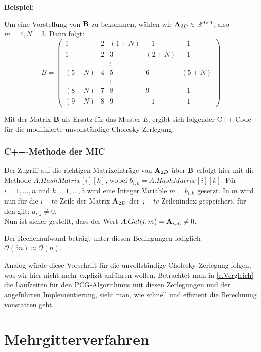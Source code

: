 \textbf{Beispiel:}

Um eine Vorstellung von ${\textbf{B}}$ zu bekommen, wählen wir ${\textbf{A}}_{2D} \in \mathbb{R}^{9 \times 9}$, also $m = 4, N = 3$. Dann folgt:
\begin{equation}
B = 
\begin{pmatrix}
1 & 2 & (1+N) & -1 & -1\\
1 & 2 & 3 & (2+N) & -1\\
  &   & \vdots & &\\
(5-N) & 4 & 5 & 6 & (5+N)\\
  &   & \vdots & &\\
(8-N) & 7 & 8 & 9 & -1\\
(9-N) & 8 & 9 & -1 & -1
\end{pmatrix}
\end{equation}

Mit der Matrix ${\textbf{B}}$ als Ersatz für das Muster $E$, ergibt sich folgender C++-Code für die modifizierte unvollständige Cholesky-Zerlegung:

\subsection{C++-Methode der MIC}\label{s.MIC}

Der Zugriff auf die richtigen Matrixeinträge von ${\textbf{A}}_{2D}$ über ${\textbf{B}}$ erfolgt hier mit die Methode $A.HashMatrix[i][k]$, wobei $b_{i,k} = A.HashMatrix[i][k]$. Für $i = 1,...,n$ und $k = 1,...,5$ wird eine Integer Variable $m = b_{i,k}$ gesetzt. In $m$ wird nun für die $i - te$ Zeile der Matrix ${\textbf{A}}_{2D}$ der $j - te$ Zeilenindex gespeichert, für den gilt: $a_{i,j} \ne 0$.\\
Nun ist sicher gestellt, dass der Wert $A.Get(i,m) = {\textbf{A}}_{i,m} \ne 0$.

Der Rechenaufwand beträgt unter diesen Bedingungen lediglich $\mathcal{O}(5n) \approx \mathcal{O}(n)$.

Analog würde diese Vorschrift für die unvollständige Cholesky-Zerlegung folgen, was wir hier nicht mehr explizit anführen wollen. Betrachtet man in \autoref{c.Vergleich} die Laufzeiten für den PCG-Algorithmus mit diesen Zerlegungen und der angeführten Implementierung, sieht man, wie schnell und effizient die Berechnung vonstatten geht.

\chapter{Mehrgitterverfahren}\label{c.Mehrgitterverfahren}

